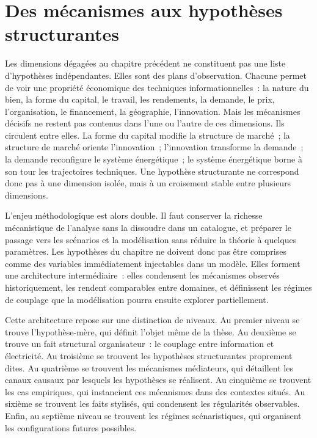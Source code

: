 
\chapter{Des mécanismes aux hypothèses structurantes}
\label{ch:hypotheses-structurantes}

Les dimensions dégagées au chapitre précédent ne constituent pas une liste d'hypothèses indépendantes. Elles sont des plans d'observation. Chacune permet de voir une propriété économique des techniques informationnelles~: la nature du bien, la forme du capital, le travail, les rendements, la demande, le prix, l'organisation, le financement, la géographie, l'innovation. Mais les mécanismes décisifs ne restent pas contenus dans l'une ou l'autre de ces dimensions. Ils circulent entre elles. La forme du capital modifie la structure de marché~; la structure de marché oriente l'innovation~; l'innovation transforme la demande~; la demande reconfigure le système énergétique~; le système énergétique borne à son tour les trajectoires techniques. Une hypothèse structurante ne correspond donc pas à une dimension isolée, mais à un croisement stable entre plusieurs dimensions.

L'enjeu méthodologique est alors double. Il faut conserver la richesse mécanistique de l'analyse sans la dissoudre dans un catalogue, et préparer le passage vers les scénarios et la modélisation sans réduire la théorie à quelques paramètres. Les hypothèses du chapitre ne doivent donc pas être comprises comme des variables immédiatement injectables dans un modèle. Elles forment une architecture intermédiaire~: elles condensent les mécanismes observés historiquement, les rendent comparables entre domaines, et définissent les régimes de couplage que la modélisation pourra ensuite explorer partiellement.

Cette architecture repose sur une distinction de niveaux. Au premier niveau se trouve l'hypothèse-mère, qui définit l'objet même de la thèse. Au deuxième se trouve un fait structural organisateur~: le couplage entre information et électricité. Au troisième se trouvent les hypothèses structurantes proprement dites. Au quatrième se trouvent les mécanismes médiateurs, qui détaillent les canaux causaux par lesquels les hypothèses se réalisent. Au cinquième se trouvent les cas empiriques, qui instancient ces mécanismes dans des contextes situés. Au sixième se trouvent les faits stylisés, qui condensent les régularités observables. Enfin, au septième niveau se trouvent les régimes scénaristiques, qui organisent les configurations futures possibles.

